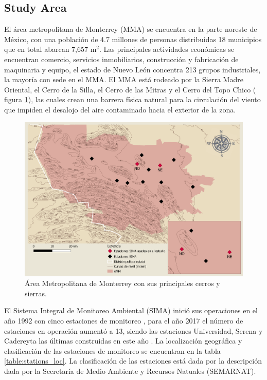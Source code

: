 \subsection{Study Area}
El área metropolitana de Monterrey (MMA) se encuentra en la parte noreste de México, con una población de 4.7 millones de personas distribuidas 18 municipios que en total abarcan 7,657 m$^2$\cite{inegi2015}. Las principales actividades económicas se encuentran comercio, servicios inmobiliarios, construcción y fabricación de maquinaria y equipo, el estado de Nuevo León concentra 213 grupos industriales, la mayoría con sede en el MMA. El MMA está rodeado por la Sierra Madre Oriental, el Cerro de la Silla, el Cerro de las Mitras y el Cerro del Topo Chico ( figura \ref{fig:map}), las cuales crean una barrera física natural para la circulación del viento que impiden el desalojo del aire contaminado hacia el exterior de la zona.\cite{proaire2008}
\begin{figure}[H]
    \centering
    \includegraphics[scale=0.2]{images/map.png}
    \caption{Área Metropolitana de Monterrey con sus principales cerros y sierras.}
    \label{fig:map}
\end{figure}
El Sistema Integral de Monitoreo Ambiental (SIMA) inició sus operaciones en el año 1992 con cinco estaciones de monitoreo , para el año 2017 el número de estaciones en operación aumentó a 13, siendo las estaciones Universidad, Serena y Cadereyta las últimas construidas en este año \cite{simapage}. La localización geográfica y clasificación de las estaciones de monitoreo se encuentran en la tabla \ref{table:stations_loc}. La clasificación de las estaciones está dada por la descripción dada por la Secretaría de Medio Ambiente y Recursos Natuales (SEMARNAT). \cite{proaire2016}

